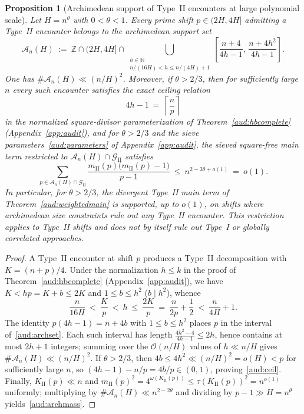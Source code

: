 \documentclass[11pt, a4paper]{article}
\theoremstyle{plain}
\newtheorem{proposition}[theorem]{Proposition}
\theoremstyle{definition}
\newcommand{\N}{\mathbb{N}}
\newcommand{\Z}{\mathbb{Z}}
\newcommand{\II}{\mathrm{II}}
\begin{document}
\begin{proposition}[Archimedean support of Type~II encounters at large polynomial scale]\label{aud:archsupport}
Let $H=n^{\theta}$ with $0<\theta<1$. Every prime shift $p\in(2H,4H]$ admitting a Type~II encounter belongs to the archimedean support set
\begin{equation}\label{aud:archset}
\mathcal{A}_n(H)\ :=\ \Z\cap(2H,4H]\cap\bigcup_{\substack{h\in\N\\ n/(16H)<h\le n/(4H)+1}}\left[\frac{n+4}{4h-1},\,\frac{n+4h^{2}}{4h-1}\right].
\end{equation}
One has $\#\mathcal{A}_n(H)\ll(n/H)^{2}$. Moreover, if $\theta>2/3$, then for sufficiently large $n$ every such encounter satisfies the exact ceiling relation
\begin{equation}\label{aud:ceil}
4h-1\ =\ \left\lceil\frac{n}{p}\right\rceil
\end{equation}
in the normalized square-divisor parameterization of Theorem~\ref{aud:hbcomplete} (Appendix~\ref{app:audit}), and for $\theta>2/3$ and the sieve parameters~\eqref{aud:parameters} of Appendix~\ref{app:audit}, the sieved square-free main term restricted to $\mathcal{A}_n(H)\cap\mathcal{G}_{\II}$ satisfies
\begin{equation}\label{aud:archmass}
\sum_{p\in\mathcal{A}_n(H)\cap\mathcal{G}_{\II}}\frac{m_{\II}(p)\big(m_{\II}(p)-1\big)}{p-1}\ \le\ n^{2-3\theta+o(1)}\ =\ o(1).
\end{equation}
In particular, for $\theta>2/3$, the divergent Type~II main term of Theorem~\ref{aud:weightedmain} is supported, up to $o(1)$, on shifts where archimedean size constraints rule out any Type~II encounter. This restriction applies to Type~II shifts and does not by itself rule out Type~I or globally correlated approaches.
\end{proposition}
\begin{proof}
A Type~II encounter at shift $p$ produces a Type~II decomposition with $K=(n+p)/4$. Under the normalization $h\le k$ in the proof of Theorem~\ref{aud:hbcomplete} (Appendix~\ref{app:audit}), we have $K<hp=K+b\le 2K$ and $1\le b\le h^{2}$ ($b\mid h^{2}$), whence
\[
\frac{n}{16H}\ <\ \frac{K}{p}\ <\ h\ \le\ \frac{2K}{p}\ =\ \frac{n}{2p}+\frac12\ <\ \frac{n}{4H}+1.
\]
The identity $p(4h-1)=n+4b$ with $1\le b\le h^{2}$ places $p$ in the interval of~\eqref{aud:archset}. Each such interval has length $\frac{4h^{2}-4}{4h-1}\le 2h$, hence contains at most $2h+1$ integers; summing over the $\mathcal{O}(n/H)$ values of $h\ll n/H$ gives $\#\mathcal{A}_n(H)\ll(n/H)^{2}$. If $\theta>2/3$, then $4b\le 4h^{2}\ll(n/H)^{2}=o(H)<p$ for sufficiently large $n$, so $(4h-1)-n/p=4b/p\in(0,1)$, proving~\eqref{aud:ceil}. Finally, $K_{\II}(p)\ll n$ and $m_{\II}(p)^{2}=4^{\omega(K_{\II}(p))}\le\tau(K_{\II}(p))^{2}=n^{o(1)}$ uniformly; multiplying by $\#\mathcal{A}_n(H)\ll n^{2-2\theta}$ and dividing by $p-1\gg H=n^{\theta}$ yields~\eqref{aud:archmass}.
\end{proof}
\end{document}
